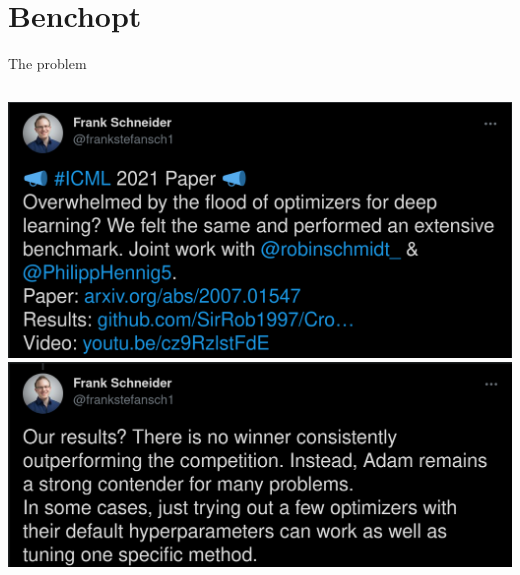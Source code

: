 \documentclass{beamer}
\begin{document}
\section{Benchopt}


\begin{frame}[fragile]{The problem}

    \begin{columns}
        \includegraphics[width=\textwidth]{tweet_steinner}
        \includegraphics[width=\textwidth]{tweet_steinner2}

\end{columns}
\end{frame}
\end{document}
